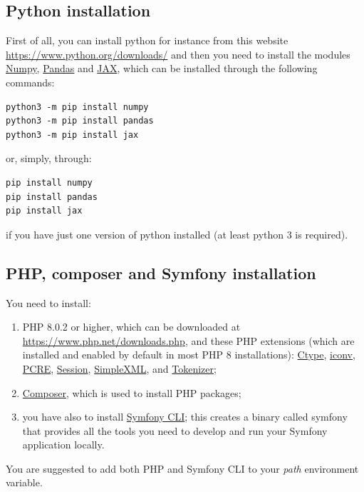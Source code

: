 \documentclass{article}
\begin{document}
\subsection{Python installation}
First of all, you can install python for instance from this website \url{https://www.python.org/downloads/} and then you need to install the modules \href{https://numpy.org/}{Numpy}, \href{https://pandas.pydata.org/}{Pandas} and \href{https://github.com/google/jax}{JAX}, which can be installed through the following commands:
\begin{verbatim}
python3 -m pip install numpy
python3 -m pip install pandas
python3 -m pip install jax
\end{verbatim}
or, simply, through:
\begin{verbatim}
pip install numpy
pip install pandas
pip install jax
\end{verbatim}
if you have just one version of python installed (at least python 3 is required).\\
\subsection{PHP, composer and Symfony installation}
You need to install:
\begin{enumerate}
    \item PHP 8.0.2 or higher, which can be downloaded at \url{https://www.php.net/downloads.php}, and these PHP extensions (which are installed and enabled by default in most PHP 8 installations): \href{https://www.php.net/book.ctype}{Ctype}, \href{https://www.php.net/book.iconv}{iconv}, \href{https://www.php.net/book.pcre}{PCRE}, \href{https://www.php.net/book.session}{Session}, \href{https://www.php.net/book.simplexml}{SimpleXML}, and \href{https://www.php.net/book.tokenizer}{Tokenizer};
    \item \href{https://getcomposer.org/download/}{Composer}, which is used to install PHP packages;
    \item you have also to install \href{https://symfony.com/download}{Symfony CLI}; this creates a binary called symfony that provides all the tools you need to develop and run your Symfony application locally.
\end{enumerate}
You are suggested to add both PHP and Symfony CLI to your \textit{path} environment variable.
\end{document}
